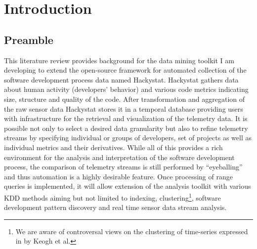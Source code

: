 \chapter{Introduction}
\section{Preamble}
This literature review provides background for the data mining toolkit I am developing to extend the open-source framework for automated collection of the software development process data named Hackystat. Hackystat gathers data about human activity (developers' behavior) and various code metrics indicating size, structure and quality of the code. After transformation and aggregation of the raw sensor data Hackystat stores it in a temporal database providing users with infrastructure for the retrieval and visualization of the telemetry data. It is possible not only to select a desired data granularity but also to refine telemetry streams by specifying individual or groups of developers, set of projects as well as individual metrics and their derivatives. While all of this provides a rich environment for the analysis and interpretation of the software development process, the comparison of telemetry streams is still performed by ``eyeballing'' and thus automation is a highly desirable feature. Once processing of range queries is implemented, it will allow extension of the analysis toolkit with various KDD methods aiming but not limited to indexing, clustering\footnote{We are aware of controversal views on the clustering of time-series expressed in \cite{citeulike:227029} by Keogh et al.}, software development pattern discovery and real time sensor data stream analysis.

